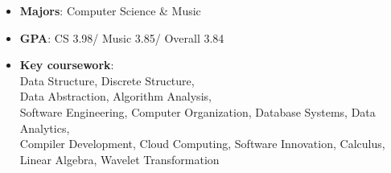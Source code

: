 \documentclass[10pt,a4paper,ragged2e]{altacv}
\begin{document}

\begin{fullwidth}
\makecvheader
\end{fullwidth}




\begin{itemize}
\item \textbf{Majors}: Computer Science \& Music
\item \textbf{GPA}: CS 3.98/ Music 3.85/ Overall 3.84
\item \textbf{Key coursework}:\\ Data Structure, Discrete Structure, \\ Data Abstraction, Algorithm Analysis, \\ Software Engineering, Computer Organization, Database Systems, Data Analytics, \\ Compiler Development, Cloud Computing, Software Innovation, Calculus, Linear Algebra,
Wavelet Transformation
\end{itemize}
\end{document}
